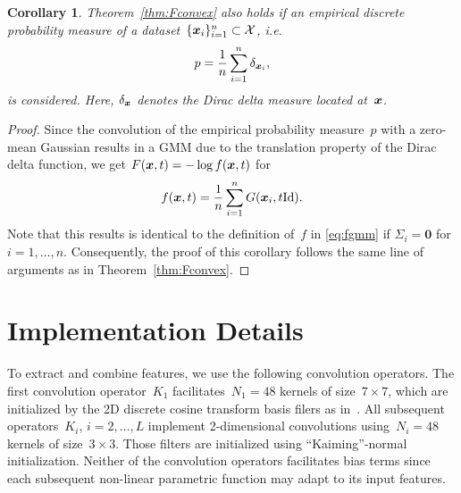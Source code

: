 \documentclass{article}
\newcommand{\X}{\mathcal{X}}
\newcommand{\id}{\mathrm{Id}}
\theoremstyle{plain}
\newtheorem{corollary}[theorem]{Corollary}
\theoremstyle{definition}
\theoremstyle{remark}
\begin{document}
\begin{corollary}
Theorem~\ref{thm:Fconvex} also holds if an empirical discrete probability measure of a dataset~$\{\vx_i\}_{i=1}^n\subset\X$, i.e.
\[
p = \frac{1}{n}\sum_{i=1}^n\delta_{{\bm{x}}_i},
\]
is considered.
Here, $\delta_{{\bm{x}}}$ denotes the Dirac delta measure located at~${\bm{x}}$.
\end{corollary}

\begin{proof}
Since the convolution of the empirical probability measure~$p$ with a zero-mean Gaussian results in a GMM due to the translation property of the Dirac delta function, we get $F({\bm{x}},t) = -\log f({\bm{x}},t)$ for
\[
f(\vx,t)=\frac{1}{n}\sum_{i=1}^n G(\vx_i, t\id).
\]
Note that this results is identical to the definition of~$f$ in \eqref{eq:fgmm} if $\Sigma_i=\bm{0}$ for $i=1,\ldots,n$.
Consequently, the proof of this corollary follows the same line of arguments as in Theorem~\ref{thm:Fconvex}.
\end{proof}

\section{Implementation Details} \label{apdx:implementationDetails}
To extract and combine features, we use the following convolution operators.
The first convolution operator~$K_1$ facilitates~$N_1=48$ kernels of size~$7\times 7$, which are initialized by the 2D discrete cosine transform basis filers as in~\citet{ChPo16,KoKl17}.
All subsequent operators~$K_i$, $i=2,\ldots,L$ implement 2-dimensional convolutions using~$N_i=48$ kernels of size~$3\times 3$.
Those filters are initialized using ``Kaiming''-normal initialization.
Neither of the convolution operators facilitates bias terms since each subsequent non-linear parametric function may adapt to its input features.
\end{document}
